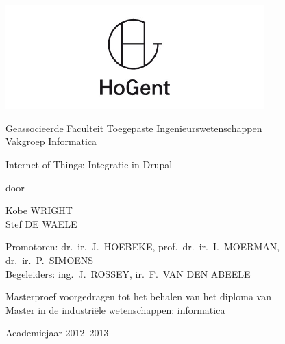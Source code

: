 

\begin{titlepage}

\setlength{\hoffset}{-1in}
\setlength{\voffset}{-1in}
\setlength{\topmargin}{1.5cm}
\setlength{\headheight}{0.5cm}
\setlength{\headsep}{1cm}
\setlength{\oddsidemargin}{3cm}
\setlength{\evensidemargin}{3cm}
\setlength{\footskip}{1.5cm}
\enlargethispage{1cm}

\fontsize{12pt}{14pt}
\selectfont

\begin{center}

\includegraphics[height=4cm]{fig/hogentLogo}

\vspace{0.5cm}

Geassocieerde Faculteit Toegepaste Ingenieurswetenschappen\\
Vakgroep Informatica

\vspace{3.5cm}

\fontsize{17.28pt}{21pt}
\selectfont

Internet of Things: Integratie in Drupal

\fontsize{12pt}{14pt}
\selectfont

\vspace{.6cm}

door 

\vspace{.4cm}

Kobe WRIGHT\\
Stef DE WAELE

\vspace{3.5cm}

Promotoren: dr.~ir.~J.~HOEBEKE, prof.~dr.~ir.~I.~MOERMAN, dr.~ir.~P.~SIMOENS\\
Begeleiders: ing.~J.~ROSSEY, ir.~F.~VAN DEN ABEELE\\

\vspace{2cm}

Masterproef voorgedragen tot het behalen van het diploma van\\
Master in de industri\"{e}le wetenschappen: informatica

\vspace{1cm}

Academiejaar 2012--2013

\end{center}
\end{titlepage}
